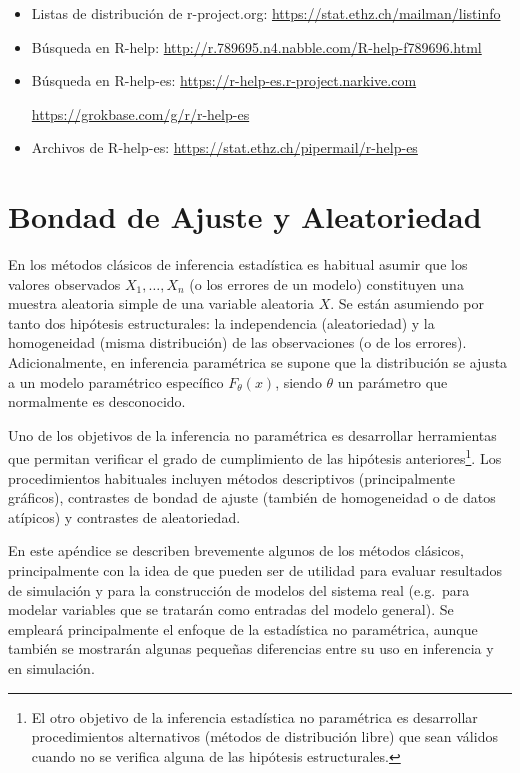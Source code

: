 \documentclass[
]{book}
\theoremstyle{break}
\theoremstyle{definition}
\theoremstyle{definition}
\theoremstyle{definition}
\theoremstyle{definition}
\theoremstyle{remark}
\begin{document}
\begin{itemize}
  \begin{itemize}
  \item
    Listas de distribución de r-project.org: \url{https://stat.ethz.ch/mailman/listinfo}
  \item
    Búsqueda en R-help: \url{http://r.789695.n4.nabble.com/R-help-f789696.html}
  \item
    Búsqueda en R-help-es: \url{https://r-help-es.r-project.narkive.com}

    \url{https://grokbase.com/g/r/r-help-es}
  \item
    Archivos de R-help-es: \url{https://stat.ethz.ch/pipermail/r-help-es}
  \end{itemize}
\end{itemize}

\hypertarget{gof-aleat}{%
\chapter{Bondad de Ajuste y Aleatoriedad}\label{gof-aleat}}

En los métodos clásicos de inferencia estadística es habitual asumir que los valores observados \(X_1,\ldots, X_n\) (o los errores de un modelo) constituyen una muestra aleatoria simple de una variable aleatoria \(X\).
Se están asumiendo por tanto dos hipótesis estructurales: la independencia (aleatoriedad) y la homogeneidad (misma distribución) de las observaciones (o de los errores).
Adicionalmente, en inferencia paramétrica se supone que la distribución se ajusta a un modelo
paramétrico específico \(F_{\theta}(x)\), siendo \(\theta\) un parámetro que normalmente es desconocido.

Uno de los objetivos de la inferencia no paramétrica es desarrollar herramientas que permitan verificar el grado de cumplimiento de las hipótesis anteriores\footnote{
  El otro objetivo de la inferencia estadística no paramétrica es desarrollar procedimientos alternativos (métodos de distribución libre) que sean válidos cuando no se verifica alguna de las hipótesis estructurales.}.
Los procedimientos habituales incluyen métodos descriptivos (principalmente gráficos), contrastes de bondad de ajuste (también de homogeneidad o de datos atípicos) y contrastes de aleatoriedad.

En este apéndice se describen brevemente algunos de los métodos clásicos, principalmente con la idea de que pueden ser de utilidad para evaluar resultados de simulación y para la construcción de modelos del sistema real (e.g.~para modelar variables que se tratarán como entradas del modelo general). Se empleará principalmente el enfoque de la estadística no paramétrica, aunque también se mostrarán algunas pequeñas diferencias entre su uso en inferencia y en simulación.
\end{document}
